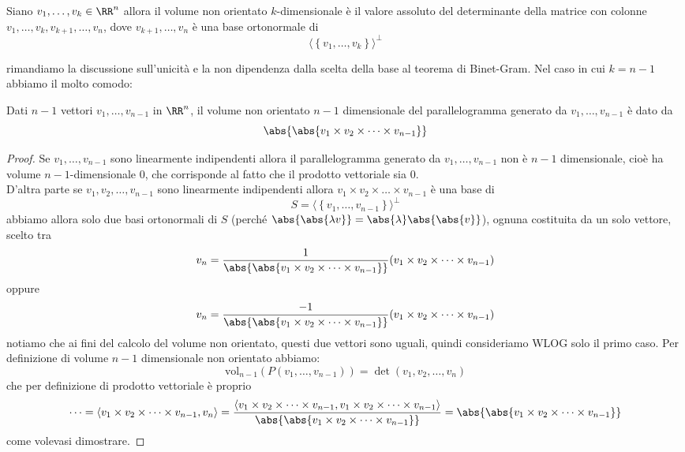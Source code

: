 \documentclass[11pt]{scrartcl}
\begin{document}
   	 \begin{definition}
   	 	Siano $v_1,\dots,v_k\in\RR^n$ allora il volume non orientato $k$-dimensionale è il valore assoluto del determinante della matrice con colonne $v_1,\dots,v_k,v_{k+1},\dots,v_n$, dove $v_{k+1},\dots,v_{n}$ è una base ortonormale di 
   	 	$$\langle \left\{v_1,\dots,v_k\right\}\rangle^\perp$$
   	 \end{definition}
   	 rimandiamo la discussione sull'unicità e la non dipendenza dalla scelta della base al teorema di Binet-Gram. Nel caso in cui $k=n-1$ abbiamo il molto comodo:
   	 \begin{proposition}
   	 	Dati $n-1$ vettori $v_1,\dots,v_{n-1}$ in $\RR^n$, il volume non orientato $n-1$ dimensionale del parallelogramma generato da $v_1,\dots,v_{n-1}$ è dato da
   	 	$$\abs{\abs{v_1\times v_2\times \dots \times v_{n-1}}}$$
   	 \end{proposition}
   	 \begin{proof}
   	 	Se $v_1,\dots,v_{n-1}$ sono linearmente indipendenti allora il parallelogramma generato da $v_1,\dots,v_{n-1}$ non è $n-1$ dimensionale, cioè ha volume $n-1$-dimensionale $0$, che corrisponde al fatto che il prodotto vettoriale sia $0$. \\
   	 	D'altra parte se $v_1,v_2,\dots,v_{n-1}$ sono linearmente indipendenti allora $v_1\times v_2\times \dots \times v_{n-1}$ è una base di 
   	 	$$S=\langle \left\{v_1,\dots,v_{n-1}\right\}\rangle^\perp$$
   	 	abbiamo allora solo due basi ortonormali di $S$ (perché $\abs{\abs{\lambda v}}=\abs{\lambda} \abs{\abs{v}}$), ognuna costituita da un solo vettore, scelto tra
   	 	$$v_n=\frac{1}{\abs{\abs{v_1\times v_2 \times \dots \times v_{n-1}}}}(v_1\times v_2 \times \dots \times v_{n-1})$$
   	 	oppure
   	 	$$v_n=\frac{-1}{\abs{\abs{v_1\times v_2 \times \dots \times v_{n-1}}}}(v_1\times v_2 \times \dots \times v_{n-1})$$
   	 	notiamo che ai fini del calcolo del volume non orientato, questi due vettori sono uguali, quindi consideriamo WLOG solo il primo caso. Per definizione di volume $n-1$ dimensionale non orientato abbiamo:
   	 	$$\text{vol}_{n-1}(P(v_1,\dots,v_{n-1}))=\det(v_1,v_2,\dots,v_n)$$
   	 	che per definizione di prodotto vettoriale è proprio
   	 	$$\dots=\langle v_1\times v_2 \times \dots \times v_{n-1},v_n\rangle=\frac{\langle v_1\times v_2 \times \dots \times v_{n-1},v_1\times v_2 \times \dots \times v_{n-1}\rangle}{\abs{\abs{v_1\times v_2 \times \dots \times v_{n-1}}}}=\abs{\abs{v_1\times v_2 \times \dots \times v_{n-1}}}$$
   	 	come volevasi dimostrare.
   	 \end{proof}
\end{document}

